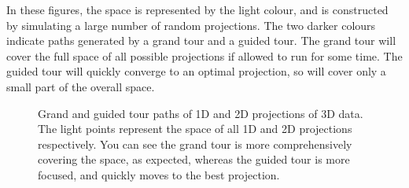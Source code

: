 \documentclass[
  letterpaper,
]{krantz}
\begin{document}
In these figures, the space is represented by the light colour, and is
constructed by simulating a large number of random projections. The two
darker colours indicate paths generated by a grand tour and a guided
tour. The grand tour will cover the full space of all possible
projections if allowed to run for some time. The guided tour will
quickly converge to an optimal projection, so will cover only a small
part of the overall space.

\begin{figure}

\begin{minipage}{0.50\linewidth}



\end{minipage}%
%
\begin{minipage}{0.50\linewidth}



\end{minipage}%

\caption{\label{fig-tour-paths-pdf}Grand and guided tour paths of 1D and
2D projections of 3D data. The light points represent the space of all
1D and 2D projections respectively. You can see the grand tour is more
comprehensively covering the space, as expected, whereas the guided tour
is more focused, and quickly moves to the best projection.
}

\end{figure}%
\end{document}
